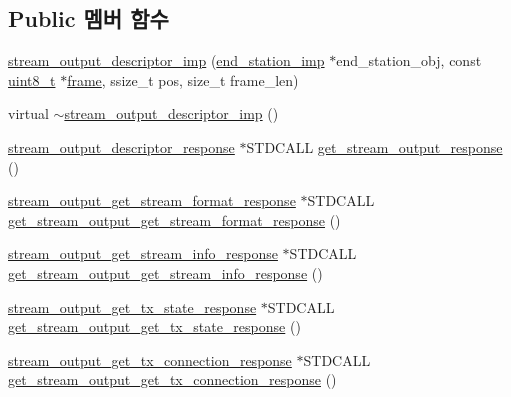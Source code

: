 \subsection*{Public 멤버 함수}
\begin{DoxyCompactItemize}
\item 
\hyperlink{classavdecc__lib_1_1stream__output__descriptor__imp_a8e7bbf34a4bee9172177b6decf1e61ad}{stream\+\_\+output\+\_\+descriptor\+\_\+imp} (\hyperlink{classavdecc__lib_1_1end__station__imp}{end\+\_\+station\+\_\+imp} $\ast$end\+\_\+station\+\_\+obj, const \hyperlink{stdint_8h_aba7bc1797add20fe3efdf37ced1182c5}{uint8\+\_\+t} $\ast$\hyperlink{gst__avb__playbin_8c_ac8e710e0b5e994c0545d75d69868c6f0}{frame}, ssize\+\_\+t pos, size\+\_\+t frame\+\_\+len)
\item 
virtual \hyperlink{classavdecc__lib_1_1stream__output__descriptor__imp_af3d20ebc8552f71e84fc07626a8a21fe}{$\sim$stream\+\_\+output\+\_\+descriptor\+\_\+imp} ()
\item 
\hyperlink{classavdecc__lib_1_1stream__output__descriptor__response}{stream\+\_\+output\+\_\+descriptor\+\_\+response} $\ast$S\+T\+D\+C\+A\+LL \hyperlink{classavdecc__lib_1_1stream__output__descriptor__imp_a52997a75713818c5a0f66d43d73abb67}{get\+\_\+stream\+\_\+output\+\_\+response} ()
\item 
\hyperlink{classavdecc__lib_1_1stream__output__get__stream__format__response}{stream\+\_\+output\+\_\+get\+\_\+stream\+\_\+format\+\_\+response} $\ast$S\+T\+D\+C\+A\+LL \hyperlink{classavdecc__lib_1_1stream__output__descriptor__imp_aaf61667b0ccb9be327d553d09452b681}{get\+\_\+stream\+\_\+output\+\_\+get\+\_\+stream\+\_\+format\+\_\+response} ()
\item 
\hyperlink{classavdecc__lib_1_1stream__output__get__stream__info__response}{stream\+\_\+output\+\_\+get\+\_\+stream\+\_\+info\+\_\+response} $\ast$S\+T\+D\+C\+A\+LL \hyperlink{classavdecc__lib_1_1stream__output__descriptor__imp_a61dee43eccecf7b2294b26b72b2a74c6}{get\+\_\+stream\+\_\+output\+\_\+get\+\_\+stream\+\_\+info\+\_\+response} ()
\item 
\hyperlink{classavdecc__lib_1_1stream__output__get__tx__state__response}{stream\+\_\+output\+\_\+get\+\_\+tx\+\_\+state\+\_\+response} $\ast$S\+T\+D\+C\+A\+LL \hyperlink{classavdecc__lib_1_1stream__output__descriptor__imp_aaff527f5b8de46f6e16421ac567b6561}{get\+\_\+stream\+\_\+output\+\_\+get\+\_\+tx\+\_\+state\+\_\+response} ()
\item 
\hyperlink{classavdecc__lib_1_1stream__output__get__tx__connection__response}{stream\+\_\+output\+\_\+get\+\_\+tx\+\_\+connection\+\_\+response} $\ast$S\+T\+D\+C\+A\+LL \hyperlink{classavdecc__lib_1_1stream__output__descriptor__imp_a7cafc3a5460f315c7d912702899d8588}{get\+\_\+stream\+\_\+output\+\_\+get\+\_\+tx\+\_\+connection\+\_\+response} ()

\end{DoxyCompactItemize}
